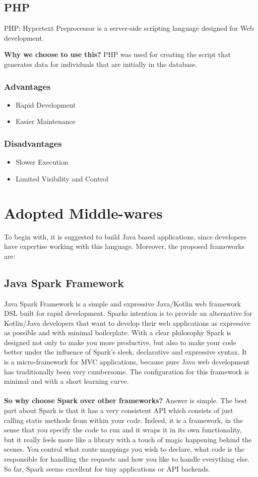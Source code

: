 \documentclass[a4paper, hidelinks, 12pt]{report}
\begin{document}
\subsection{PHP}
PHP: Hypertext Preprocessor is a server-side scripting language designed for Web development. 

\textbf{Why we choose to use this?} PHP was used for creating the script that generates data for individuals that are initially in the database.
\subsubsection{Advantages}
\begin{itemize}
\item{} Rapid Development
\item{} Easier Maintenance
\end{itemize}

\subsubsection{Disadvantages}
\begin{itemize}
\item{} Slower Execution
\item{} Limited Visibility and Control
\end{itemize}

	\section{Adopted Middle-wares}
	To begin with, it is suggested to build Java based applications, since developers have expertise working with this language. Moreover, the proposed frameworks are:
\subsection{Java Spark Framework} Java Spark Framework is a simple and expressive Java/Kotlin web framework DSL built for rapid development. Sparks intention is to provide an alternative for Kotlin/Java developers that want to develop their web applications as expressive as possible and with minimal boilerplate. With a clear philosophy Spark is designed not only to make you more productive, but also to make your code better under the influence of Spark’s sleek, declarative and expressive syntax. It is a micro-framework for MVC applications, because pure Java web development has traditionally been very cumbersome. The configuration for this framework is minimal and with a short learning curve.\\\\
\textbf{So why choose Spark over other frameworks?} Answer is simple. The best part about Spark is that it has a very consistent API which consists of just calling static methods from within your code. Indeed, it is a framework, in the sense that you specify the code to run and it wraps it in its own functionality, but it really feels more like a library with a touch of magic happening behind the scenes. You control what route mappings you wish to declare, what code is the responsible for handling the requests and how you like to handle everything else. So far, Spark seems excellent for tiny applications or API backends.
\end{document}
